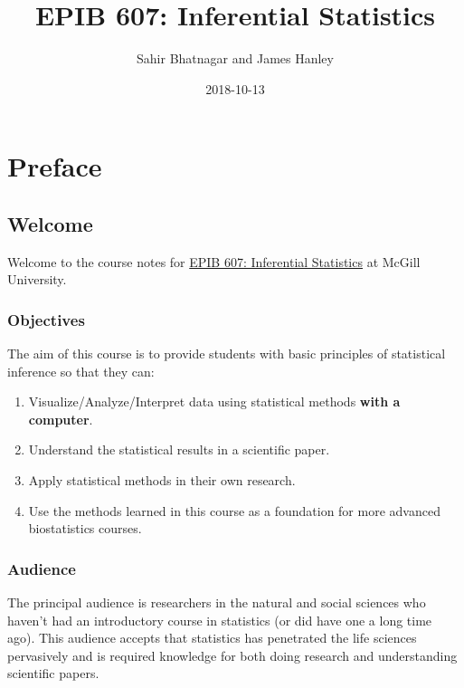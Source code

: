\documentclass[]{book}
\title{EPIB 607: Inferential Statistics}
\author{Sahir Bhatnagar and James Hanley}
\date{2018-10-13}
\providecommand{\tightlist}{%
  \setlength{\itemsep}{0pt}\setlength{\parskip}{0pt}}
\providecommand{\tightlist}{%
  \setlength{\itemsep}{0pt}\setlength{\parskip}{0pt}}
\theoremstyle{definition}
\theoremstyle{definition}
\theoremstyle{definition}
\theoremstyle{remark}
\begin{document}
\maketitle

{
\setcounter{tocdepth}{1}
\tableofcontents
}
\part{Preface}\label{part-preface}

\chapter{Welcome}\label{welcome}

Welcome to the course notes for
\href{https://www.mcgill.ca/study/2018-2019/courses/epib-607}{EPIB 607:
Inferential Statistics} at McGill University.

\section{Objectives}\label{objectives}

The aim of this course is to provide students with basic principles of
statistical inference so that they can:

\begin{enumerate}
\def\labelenumi{\arabic{enumi}.}
\tightlist
\item
  Visualize/Analyze/Interpret data using statistical methods
  \textbf{with a computer}.
\item
  Understand the statistical results in a scientific paper.\\
\item
  Apply statistical methods in their own research.\\
\item
  Use the methods learned in this course as a foundation for more
  advanced biostatistics courses.
\end{enumerate}

\section{Audience}\label{audience}

The principal audience is researchers in the natural and social sciences
who haven't had an introductory course in statistics (or did have one a
long time ago). This audience accepts that statistics has penetrated the
life sciences pervasively and is required knowledge for both doing
research and understanding scientific papers.
\end{document}
